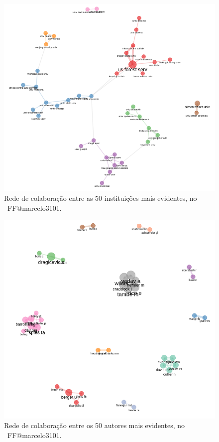 \begin{figure}
    \centering
    \includegraphics[width=1\textwidth]{exploratory-data-analysis/marcelo3101/PesqBibliogr/ForestFire/WoS-20221204/assets/CollabInst.png}
    \caption{Rede de colaboração entre as 50 instituições mais evidentes, no  \dataset\ FF@marcelo3101.}
    \label{fig:FF@marcelo3101:Collaboration-Network-50instit}
\end{figure}

\begin{figure}
    \centering
    \includegraphics[width=1\textwidth]{exploratory-data-analysis/marcelo3101/PesqBibliogr/ForestFire/WoS-20221204/assets/CollabAuthors.png}
    \caption{Rede de colaboração entre os 50 autores mais evidentes, no  \dataset\ FF@marcelo3101.}
    \label{fig:FF@marcelo3101:Collaboration-Network-50authors}
\end{figure}

